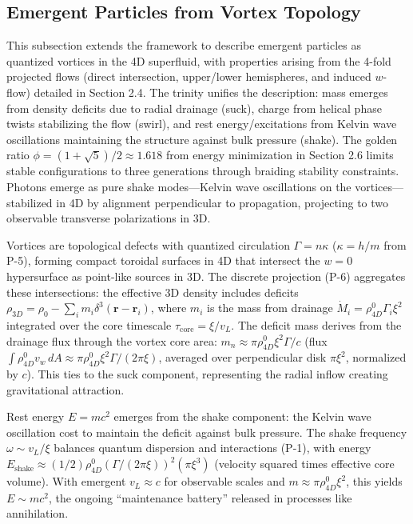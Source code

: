 \subsection{Emergent Particles from Vortex Topology}

This subsection extends the framework to describe emergent particles as quantized vortices in the 4D superfluid, with properties arising from the 4-fold projected flows (direct intersection, upper/lower hemispheres, and induced $w$-flow) detailed in Section 2.4. The trinity unifies the description: mass emerges from density deficits due to radial drainage (suck), charge from helical phase twists stabilizing the flow (swirl), and rest energy/excitations from Kelvin wave oscillations maintaining the structure against bulk pressure (shake). The golden ratio $\phi = (1 + \sqrt{5})/2 \approx 1.618$ from energy minimization in Section 2.6 limits stable configurations to three generations through braiding stability constraints. Photons emerge as pure shake modes---Kelvin wave oscillations on the vortices---stabilized in 4D by alignment perpendicular to propagation, projecting to two observable transverse polarizations in 3D.

Vortices are topological defects with quantized circulation $\Gamma = n \kappa$ ($\kappa = h / m$ from P-5), forming compact toroidal surfaces in 4D that intersect the $w=0$ hypersurface as point-like sources in 3D. The discrete projection (P-6) aggregates these intersections: the effective 3D density includes deficits $\rho_{3D} = \rho_0 - \sum_i m_i \delta^3(\mathbf{r} - \mathbf{r}_i)$, where $m_i$ is the mass from drainage $\dot{M}_i = \rho_{4D}^0 \Gamma_i \xi^2$ integrated over the core timescale $\tau_{\text{core}} = \xi / v_L$. The deficit mass derives from the drainage flux through the vortex core area: $m_n \approx \pi \rho_{4D}^0 \xi^2 \Gamma / c$ (flux $\int \rho_{4D}^0 v_w \, dA \approx \pi \rho_{4D}^0 \xi^2 \Gamma / (2\pi \xi)$, averaged over perpendicular disk $\pi \xi^2$, normalized by $c$). This ties to the suck component, representing the radial inflow creating gravitational attraction.

Rest energy $E = m c^2$ emerges from the shake component: the Kelvin wave oscillation cost to maintain the deficit against bulk pressure. The shake frequency $\omega \sim v_L / \xi$ balances quantum dispersion and interactions (P-1), with energy $E_{\text{shake}} \approx (1/2) \rho_{4D}^0 (\Gamma / (2\pi \xi))^2 (\pi \xi^3)$ (velocity squared times effective core volume). With emergent $v_L \approx c$ for observable scales and $m \approx \pi \rho_{4D}^0 \xi^2$, this yields $E \sim m c^2$, the ongoing ``maintenance battery'' released in processes like annihilation.

